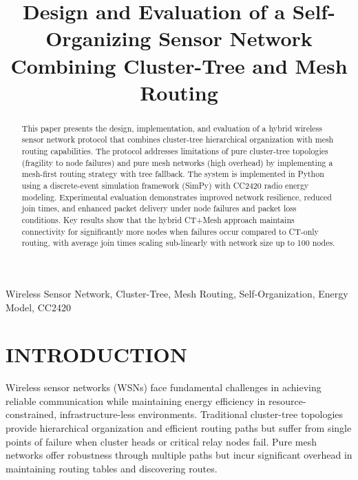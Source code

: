 \documentclass[conference]{IEEEtran}
\begin{document}
\title{Design and Evaluation of a Self-Organizing Sensor Network Combining Cluster-Tree and Mesh Routing}

\author{
}

\maketitle

\begin{abstract}
This paper presents the design, implementation, and evaluation of a hybrid wireless sensor network protocol that combines cluster-tree hierarchical organization with mesh routing capabilities. The protocol addresses limitations of pure cluster-tree topologies (fragility to node failures) and pure mesh networks (high overhead) by implementing a mesh-first routing strategy with tree fallback. The system is implemented in Python using a discrete-event simulation framework (SimPy) with CC2420 radio energy modeling. Experimental evaluation demonstrates improved network resilience, reduced join times, and enhanced packet delivery under node failures and packet loss conditions. Key results show that the hybrid CT+Mesh approach maintains connectivity for significantly more nodes when failures occur compared to CT-only routing, with average join times scaling sub-linearly with network size up to 100 nodes.
\end{abstract}

\begin{IEEEkeywords}
Wireless Sensor Network, Cluster-Tree, Mesh Routing, Self-Organization, Energy Model, CC2420
\end{IEEEkeywords}

\section{INTRODUCTION}

Wireless sensor networks (WSNs) face fundamental challenges in achieving reliable communication while maintaining energy efficiency in resource-constrained, infrastructure-less environments. Traditional cluster-tree topologies provide hierarchical organization and efficient routing paths but suffer from single points of failure when cluster heads or critical relay nodes fail. Pure mesh networks offer robustness through multiple paths but incur significant overhead in maintaining routing tables and discovering routes.
\end{document}

